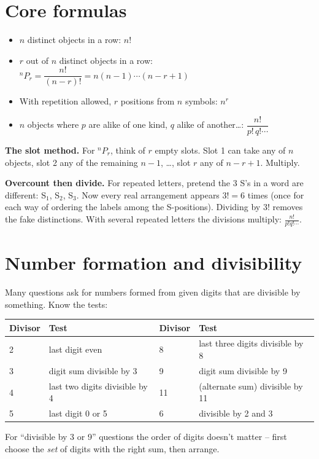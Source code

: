 \documentclass[11pt,a4paper,openany]{report}
\begin{document}
\section{Core formulas}
\begin{itemize}
\item $n$ distinct objects in a row: $n!$
\item $r$ out of $n$ distinct objects in a row: $^nP_r=\dfrac{n!}{(n-r)!}=n(n-1)\cdots(n-r+1)$
\item With repetition allowed, $r$ positions from $n$ symbols: $n^r$
\item $n$ objects where $p$ are alike of one kind, $q$ alike of another\dots:
$\dfrac{n!}{p!\,q!\cdots}$
\end{itemize}

\begin{why}
\textbf{The slot method.} For $^nP_r$, think of $r$ empty slots. Slot 1 can take any of $n$ objects,
slot 2 any of the remaining $n-1$, \dots, slot $r$ any of $n-r+1$. Multiply.

\textbf{Overcount then divide.} For repeated letters, pretend the 3 S's in a word are different:
S$_1$, S$_2$, S$_3$. Now every real arrangement appears $3!=6$ times (once for each way of ordering the
labels among the S-positions). Dividing by $3!$ removes the fake distinctions. With several repeated
letters the divisions multiply: $\frac{n!}{p!q!\cdots}$.
\end{why}

\section{Number formation and divisibility}
Many questions ask for numbers formed from given digits that are divisible by something. Know the tests:
\begin{center}\small
\begin{tabular}{ll|ll}
\toprule
Divisor & Test & Divisor & Test\\\midrule
2 & last digit even & 8 & last three digits divisible by 8\\
3 & digit sum divisible by 3 & 9 & digit sum divisible by 9\\
4 & last two digits divisible by 4 & 11 & (alternate sum) divisible by 11\\
5 & last digit 0 or 5 & 6 & divisible by 2 and 3\\
\bottomrule
\end{tabular}
\end{center}
For ``divisible by 3 or 9'' questions the order of digits doesn't matter -- first choose the
\emph{set} of digits with the right sum, then arrange.
\end{document}
